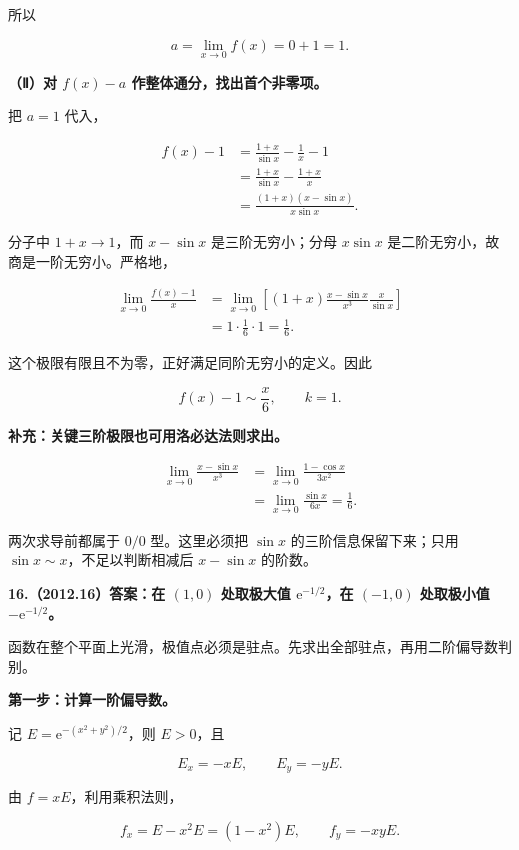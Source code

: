 \documentclass[UTF8,11pt,fontset=windows]{ctexart}
\begin{document}
所以

$$
a=\lim_{x\to0}f(x)=0+1=1.
$$

\textbf{（Ⅱ）对 $f(x)-a$ 作整体通分，找出首个非零项。}

把 $a=1$ 代入，

$$
\begin{aligned}
f(x)-1
&=\frac{1+x}{\sin x}-\frac1x-1\\
&=\frac{1+x}{\sin x}-\frac{1+x}{x}\\
&=\frac{(1+x)(x-\sin x)}{x\sin x}.
\end{aligned}
$$

分子中 $1+x\to1$，而 $x-\sin x$ 是三阶无穷小；分母 $x\sin x$ 是二阶无穷小，故商是一阶无穷小。严格地，

$$
\begin{aligned}
\lim_{x\to0}\frac{f(x)-1}{x}
&=\lim_{x\to0}
\left[(1+x)\frac{x-\sin x}{x^3}\frac{x}{\sin x}\right]\\
&=1\cdot\frac16\cdot1=\frac16.
\end{aligned}
$$

这个极限有限且不为零，正好满足同阶无穷小的定义。因此

$$
f(x)-1\sim\frac{x}{6},
\qquad k=1.
$$

\textbf{补充：关键三阶极限也可用洛必达法则求出。}

$$
\begin{aligned}
\lim_{x\to0}\frac{x-\sin x}{x^3}
&=\lim_{x\to0}\frac{1-\cos x}{3x^2}\\
&=\lim_{x\to0}\frac{\sin x}{6x}
=\frac16.
\end{aligned}
$$

两次求导前都属于 $0/0$ 型。这里必须把 $\sin x$ 的三阶信息保留下来；只用 $\sin x\sim x$，不足以判断相减后 $x-\sin x$ 的阶数。

\clearpage

\textbf{16.（2012.16）答案：在 $(1,0)$ 处取极大值 $\mathrm e^{-1/2}$，在 $(-1,0)$ 处取极小值 $-\mathrm e^{-1/2}$。}

函数在整个平面上光滑，极值点必须是驻点。先求出全部驻点，再用二阶偏导数判别。

\textbf{第一步：计算一阶偏导数。}

记 $E=\mathrm e^{-(x^2+y^2)/2}$，则 $E>0$，且

$$
E_x=-xE,
\qquad E_y=-yE.
$$

由 $f=xE$，利用乘积法则，

$$
f_x=E-x^2E=(1-x^2)E,
\qquad
f_y=-xyE.
$$
\end{document}
